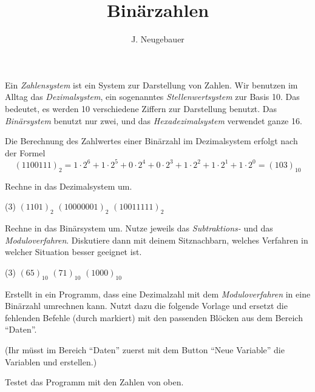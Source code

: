 \documentclass[10pt, a4paper, final]{scrartcl}
\author{J. Neugebauer}
\title{Binärzahlen}
\date{\Heute}
\begin{document}
\ReiheTitel

Ein \emph{Zahlensystem} ist ein System zur Darstellung von Zahlen. Wir benutzen im Alltag das \emph{Dezimalsystem}, ein sogenanntes \emph{Stellenwertsystem} zur Basis 10. Das bedeutet, es werden 10 verschiedene Ziffern zur Darstellung benutzt. Das \emph{Binärsystem} benutzt nur zwei, und das \emph{Hexadezimalsystem} verwendet ganze 16.

Die Berechnung des Zahlwertes einer Binärzahl im Dezimalsystem erfolgt nach der Formel
\[ (1100111)_2 = 1\cdot 2^6 + 1\cdot 2^5 + 0\cdot 2^4 + 0\cdot 2^3 + 1\cdot 2^2 + 1\cdot 2^1 + 1\cdot 2^0 = (103)_{10} \]

\begin{aufgabe}[symbol=\Large\symHeft]
	Rechne in das Dezimalsystem um.
	\begin{tasks}(3)
		\task $(1101)_2$
		\task $(1000 0001)_2$
		\task $(1001 1111)_2$
	\end{tasks}
\end{aufgabe}

\begin{aufgabe}[symbol=\Large\symHeft\yspace\symPartner]
	Rechne in das Binärsystem um. Nutze jeweils das \emph{Subtraktions-} und das \emph{Moduloverfahren}. Diskutiere dann mit deinem Sitznachbarn, welches Verfahren in welcher Situation besser geeignet ist.
	\begin{tasks}(3)
		\task $(65)_{10}$
		\task $(71)_{10}$
		\task $(1000)_{10}$
	\end{tasks}
\end{aufgabe}

\begin{aufgabe}[symbol=\Large\symLaptop\yspace\symPartner]
	Erstellt in  ein Programm, dass eine Dezimalzahl mit dem \emph{Moduloverfahren} in eine Binärzahl umrechnen kann. Nutzt dazu die folgende Vorlage und ersetzt die fehlenden Befehle (durch  markiert) mit den passenden Blöcken aus dem Bereich \enquote{Daten}.
	
	(Ihr müsst im Bereich \enquote{Daten} zuerst mit dem Button \enquote{Neue Variable} die Variablen  und  erstellen.)
	
	\begin{center}
	\end{center}
	
	Testet das Programm mit den Zahlen von oben.
\end{aufgabe}
\end{document}
